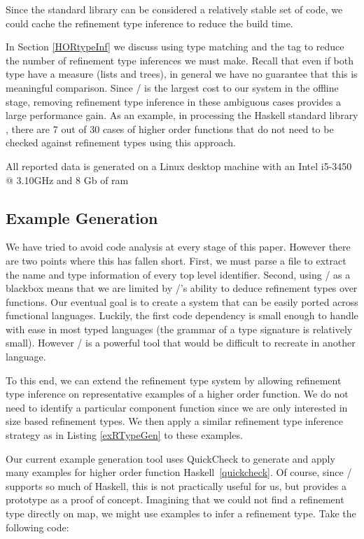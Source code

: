 Since the standard library can be considered a relatively stable set of code, we could cache the refinement type inference to reduce the build time.

In Section \ref{HORtypeInf} we discuss using type matching and the  tag to reduce the number of refinement type inferences we must make. 
Recall that even if both type have a measure (lists and trees), in general we have no guarantee that this is meaningful comparison.
Since \lhask/ is the largest cost to our system in the offline stage, removing refinement type inference in these ambiguous cases provides a large performance gain.
As an example, in processing the Haskell standard library , there are 7 out of 30 cases of higher order functions that do not need to be checked against refinement types using this approach.

All reported data is generated on a Linux desktop machine with an Intel i5-3450 @ 3.10GHz and 8 Gb of ram

\subsection{Example Generation}\label{languageSupport}

We have tried to avoid code analysis at every stage of this paper.
However there are two points where this has fallen short. 
First, we must parse a file to extract the name and type information of every top level identifier. 
Second, using \lhask/ as a blackbox means that we are limited by \lhask/'s ability to deduce refinement types over functions. 
Our eventual goal is to create a system that can be easily ported across functional languages. 
Luckily, the first code dependency is small enough to handle with ease in most typed languages (the grammar of a type signature is relatively small). However \lhask/ is a powerful tool that would be difficult to recreate in another language. 

To this end, we can extend the refinement type system by allowing refinement type inference on representative examples of a higher order function.
We do not need to identify a particular component function since we are only interested in size based refinement types.
We then apply a similar refinement type inference strategy as in Listing \ref{exRTypeGen} to these examples.

Our current example generation tool uses QuickCheck to generate and apply many examples for higher order function Haskell~\ref{quickcheck}.
Of course, since \lhask/ supports so much of Haskell, this is not practically useful for us, but provides a prototype as a proof of concept.
Imagining that we could not find a refinement type directly on map, we might use examples to infer a refinement type. Take the following code:

